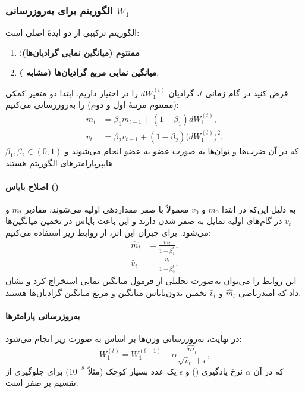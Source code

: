 \documentclass{article}
\begin{document}
\subsubsection{الگوریتم  برای به‌روزرسانی $W_1$}

الگوریتم  ترکیبی از دو ایدهٔ اصلی است:
\begin{enumerate}
	\item \textbf{ممنتوم (میانگین نمایی گرادیان‌ها)}؛
	\item \textbf{میانگین نمایی مربع گرادیان‌ها (مشابه )}.
\end{enumerate}

فرض کنید در گام زمانی $t$، گرادیان $dW_1^{(t)}$ را در اختیار داریم. ابتدا دو متغیر کمکی (ممنتوم مرتبهٔ اول و دوم) را به‌روزرسانی می‌کنیم:
\begin{align}
	m_t &= \beta_1 m_{t-1} + (1 - \beta_1) dW_1^{(t)}, \\
	v_t &= \beta_2 v_{t-1} + (1 - \beta_2) \big(dW_1^{(t)}\big)^2,
\end{align}
که در آن ضرب‌ها و توان‌ها به صورت عضو به عضو انجام می‌شوند و $\beta_1, \beta_2 \in (0,1)$ هایپرپارامترهای الگوریتم هستند.

\paragraph{اصلاح بایاس ()}  
به دلیل این‌که در ابتدا $m_0$ و $v_0$ معمولاً با صفر مقداردهی اولیه می‌شوند، مقادیر $m_t$ و $v_t$ در گام‌های اولیه تمایل به صفر شدن دارند و این باعث بایاس در تخمین میانگین‌ها می‌شود. برای جبران این اثر، از روابط زیر استفاده می‌کنیم:
\begin{align}
	\hat{m}_t &= \frac{m_t}{1 - \beta_1^t}, \\
	\hat{v}_t &= \frac{v_t}{1 - \beta_2^t}.
\end{align}
این روابط را می‌توان به‌صورت تحلیلی از فرمول میانگین نمایی استخراج کرد و نشان داد که امیدریاضی $\hat{m}_t$ و $\hat{v}_t$ تخمین بدون‌بایاس میانگین و مربع میانگین گرادیان‌ها هستند.

\paragraph{به‌روزرسانی پارامترها}  
در نهایت، به‌روزرسانی وزن‌ها بر اساس  به صورت زیر انجام می‌شود:
\begin{equation}
	W_1^{(t)} = W_1^{(t-1)} - \alpha \frac{\hat{m}_t}{\sqrt{\hat{v}_t} + \epsilon},
\end{equation}
که در آن $\alpha$ نرخ یادگیری () و $\epsilon$ یک عدد بسیار کوچک (مثلاً $10^{-8}$) برای جلوگیری از تقسیم بر صفر است.
\end{document}
